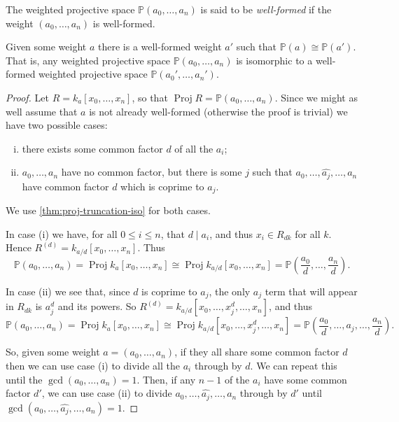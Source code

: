 \documentclass[10pt,notitlepage]{article}
\numberwithin{equation}{subsection}
\DeclareMathOperator{\proj}{Proj}
\newcommand{\pee}{\mathbb{P}}
\newcommand{\remove}[1]{\widehat{#1}}
\newcommand{\kazn}{k_a[x_0,\ldots,x_n]}
\newcommand{\pazn}{\pee(a_0,\ldots,a_n)}
\newcommand{\padzn}{\pee(a_0',\ldots,a_n')}
\begin{document}
        \begin{definition}
            The weighted projective space $\pazn$ is said to be \emph{well-formed} if the weight $(a_0,\ldots,a_n)$ is well-formed.
        \end{definition}

        \begin{theorem}\label{thm:can-always-well-form}
            Given some weight $a$ there is a well-formed weight $a'$ such that $\pee(a)\cong\pee(a')$.
            That is, any weighted projective space $\pazn$ is isomorphic to a well-formed weighted projective space $\padzn$.
        \end{theorem}

        \begin{proof}
            Let $R=\kazn$, so that $\proj R=\pazn$.
            Since we might as well assume that $a$ is not already well-formed (otherwise the proof is trivial) we have two possible cases:
            \begin{enumerate}[(i)]
                \item there exists some common factor $d$ of all the $a_i$;
                \item $a_0,\ldots,a_n$ have no common factor, but there is some $j$ such that $a_0,\ldots,\remove{a_j},\ldots,a_n$ have common factor $d$ which is coprime to $a_j$.
            \end{enumerate}
            We use \cref{thm:proj-truncation-iso} for both cases.

            \bigskip

            In case (i) we have, for all $0\leqslant i\leqslant n$, that $d\mid a_i$, and thus $x_i\in R_{dk}$ for all $k$.
            Hence $R^{(d)}=k_{a/d}[x_0,\ldots,x_n]$.
            Thus
            \[
                \pazn =\proj\kazn \cong \proj k_{a/d}[x_0,\ldots,x_n] = \pee\left(\frac{a_0}{d},\ldots,\frac{a_n}{d}\right).
            \]

            \bigskip

            In case (ii) we see that, since $d$ is coprime to $a_j$, the only $a_j$ term that will appear in $R_{dk}$ is $a_j^d$ and its powers.
            So $R^{(d)}=k_{a/d}[x_0,\ldots,x_j^d,\ldots,x_n]$, and thus
            \[
                \pazn =\proj\kazn \cong \proj k_{a/d}[x_0,\ldots,x_j^d,\ldots,x_n] = \pee\left(\frac{a_0}{d},\ldots,a_j,\ldots,\frac{a_n}{d}\right).
            \]

            \bigskip

            So, given some weight $a=(a_0,\ldots,a_n)$, if they all share some common factor $d$ then we can use case (i) to divide all the $a_i$ through by $d$.
            We can repeat this until the $\gcd(a_0,\ldots,a_n)=1$.
            Then, if any $n-1$ of the $a_i$ have some common factor $d'$, we can use case (ii) to divide $a_0,\ldots,\remove{a_j},\ldots,a_n$ through by $d'$ until $\gcd(a_0,\ldots,\remove{a_j},\ldots,a_n)=1$.
        \end{proof}
\end{document}
